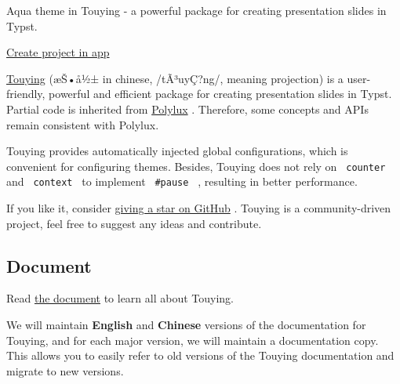Aqua theme in Touying - a powerful package for creating presentation
slides in Typst.

\href{/app?template=touying-aqua&version=0.5.3}{Create project in app}

\label{readme}
\href{https://github.com/touying-typ/touying}{Touying} (æŠ•å½± in
chinese, /tÃ³uyÇ?ng/, meaning projection) is a user-friendly, powerful
and efficient package for creating presentation slides in Typst. Partial
code is inherited from
\href{https://github.com/andreasKroepelin/polylux}{Polylux} . Therefore,
some concepts and APIs remain consistent with Polylux.

Touying provides automatically injected global configurations, which is
convenient for configuring themes. Besides, Touying does not rely on
\texttt{\ counter\ } and \texttt{\ context\ } to implement
\texttt{\ \#pause\ } , resulting in better performance.

If you like it, consider
\href{https://github.com/touying-typ/touying}{giving a star on GitHub} .
Touying is a community-driven project, feel free to suggest any ideas
and contribute.

\href{https://touying-typ.github.io/}{}
\href{https://github.com/touying-typ/touying/wiki}{}

\subsection{Document}\label{document}

Read \href{https://touying-typ.github.io/}{the document} to learn all
about Touying.

We will maintain \textbf{English} and \textbf{Chinese} versions of the
documentation for Touying, and for each major version, we will maintain
a documentation copy. This allows you to easily refer to old versions of
the Touying documentation and migrate to new versions.


